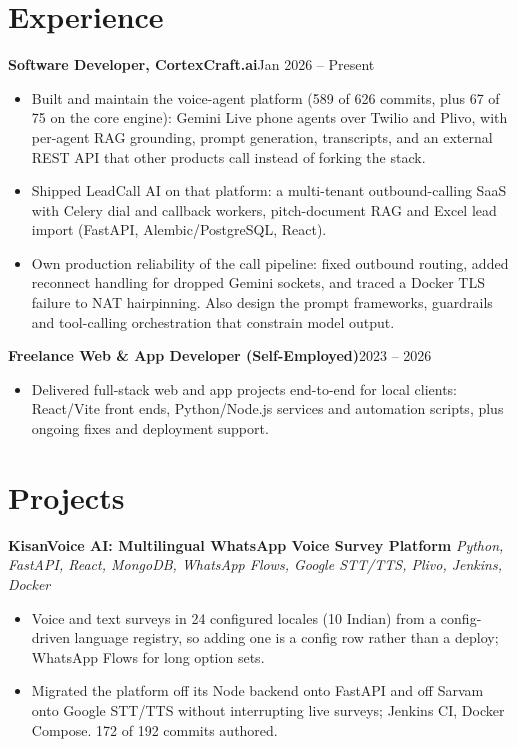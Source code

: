\documentclass[10pt,a4paper]{article}
\newcommand{\entry}[2]{\textbf{#1}\hfill{#2}\par}
\begin{document}
\section{Experience}

\entry{Software Developer, CortexCraft.ai}{Jan 2026 -- Present}
\begin{itemize}
  \item Built and maintain the voice-agent platform (589 of 626 commits, plus 67 of 75 on the core engine): Gemini Live phone
        agents over Twilio and Plivo, with per-agent RAG grounding, prompt generation, transcripts, and an
        external REST API that other products call instead of forking the stack.
  \item Shipped LeadCall AI on that platform: a multi-tenant outbound-calling SaaS with Celery dial and
        callback workers, pitch-document RAG and Excel lead import (FastAPI, Alembic/PostgreSQL, React).
  \item Own production reliability of the call pipeline: fixed outbound routing, added reconnect handling
        for dropped Gemini sockets, and traced a Docker TLS failure to NAT hairpinning. Also design the
        prompt frameworks, guardrails and tool-calling orchestration that constrain model output.
\end{itemize}

\vspace{2pt}
\entry{Freelance Web \& App Developer (Self-Employed)}{2023 -- 2026}
\begin{itemize}
  \item Delivered full-stack web and app projects end-to-end for local clients: React/Vite front ends,
        Python/Node.js services and automation scripts, plus ongoing fixes and deployment support.
\end{itemize}

\section{Projects}

\textbf{KisanVoice AI: Multilingual WhatsApp Voice Survey Platform} \textit{Python, FastAPI, React, MongoDB, WhatsApp Flows, Google STT/TTS, Plivo, Jenkins, Docker}
\begin{itemize}
  \item Voice and text surveys in 24 configured locales (10 Indian) from a config-driven language
        registry, so adding one is a config row rather than a deploy; WhatsApp Flows for long option sets.
  \item Migrated the platform off its Node backend onto FastAPI and off Sarvam onto Google STT/TTS
        without interrupting live surveys; Jenkins CI, Docker Compose. 172 of 192 commits authored.
\end{itemize}
\end{document}
